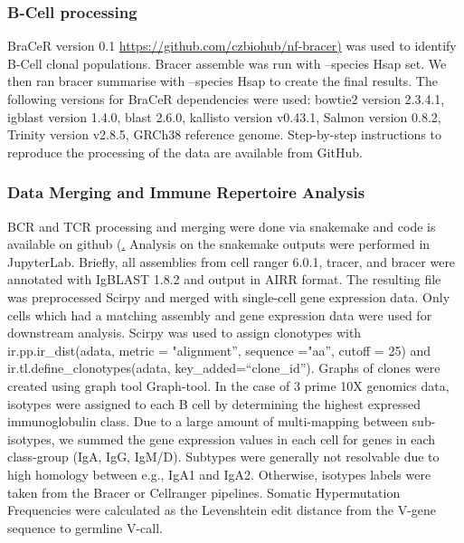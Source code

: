 \subsubsection{B-Cell processing}
BraCeR\cite{lindeman2018bracer} version 0.1 \url{https://github.com/czbiohub/nf-bracer)} was used to identify B-Cell clonal
populations. Bracer assemble was run with --species Hsap set. We then ran bracer summarise
with --species Hsap to create the final results. The following versions for BraCeR dependencies
were used: bowtie2 version 2.3.4.1, igblast version 1.4.0, blast 2.6.0, kallisto version v0.43.1,
Salmon version 0.8.2, Trinity version v2.8.5, GRCh38 reference genome. Step-by-step
instructions to reproduce the processing of the data are available from GitHub.
\subsubsection{Data Merging and Immune Repertoire Analysis}
BCR and TCR processing and merging were done via snakemake\cite{koster2012snakemake} and code is available on
github (\href{https://github.com/czbiohub/tabula-sapiens}. Analysis on the snakemake outputs were
performed in JupyterLab. Briefly, all assemblies from cell ranger 6.0.1, tracer, and bracer were
annotated with IgBLAST 1.8.2\cite{ye_igblast_2013} and output in AIRR format. The resulting file was preprocessed
Scirpy\cite{sturm_scirpy_2020} and merged with single-cell gene expression data. Only cells which had a matching
assembly and gene expression data were used for downstream analysis. Scirpy was used to
assign clonotypes with ir.pp.ir_dist(adata, metric = "alignment”, sequence ="aa”, cutoff = 25) and
ir.tl.define_clonotypes(adata, key_added=``clone_id”). Graphs of clones were created using graph
tool Graph-tool\cite{peixoto_graph-tool_2014}. In the case of 3 prime 10X genomics data, isotypes
were assigned to each B cell by determining the highest expressed immunoglobulin class. Due to a large amount of multi-mapping between sub-isotypes, we
summed the gene expression values in each cell for genes in each class-group (IgA, IgG, IgM/D).
Subtypes were generally not resolvable due to high homology between e.g., IgA1 and IgA2. Otherwise, isotypes labels were taken from the Bracer or Cellranger pipelines.
Somatic Hypermutation Frequencies were calculated as the Levenshtein edit distance from the V-gene sequence
to germline V-call.
